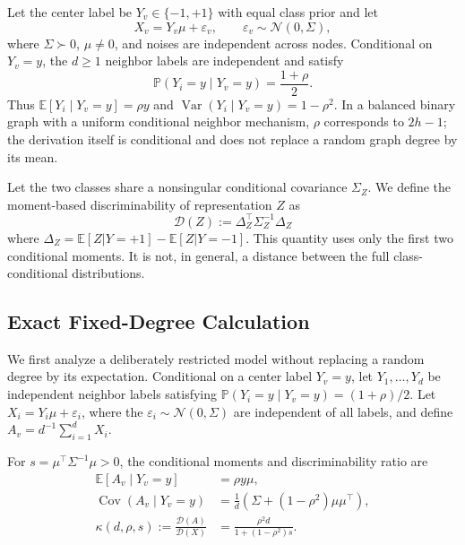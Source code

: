 Let the center label be $Y_v\in\{-1,+1\}$ with equal class prior and let
\begin{equation}
    X_v=Y_v\mu+\varepsilon_v,
    \qquad \varepsilon_v\sim\mathcal{N}(0,\Sigma),
\end{equation}
where $\Sigma\succ0$, $\mu\neq0$, and noises are independent across nodes. Conditional on $Y_v=y$, the $d\geq1$ neighbor labels are independent and satisfy
\begin{equation}
    \mathbb{P}(Y_i=y\mid Y_v=y)=\frac{1+\rho}{2}.
\end{equation}
Thus $\mathbb{E}[Y_i\mid Y_v=y]=\rho y$ and $\operatorname{Var}(Y_i\mid Y_v=y)=1-\rho^2$. In a balanced binary graph with a uniform conditional neighbor mechanism, $\rho$ corresponds to $2h-1$; the derivation itself is conditional and does not replace a random graph degree by its mean.

\begin{definition}
\label{def:discriminability}
Let the two classes share a nonsingular conditional covariance $\Sigma_Z$. We define the moment-based discriminability of representation $Z$ as
\begin{equation}
    \mathcal{D}(Z) := \Delta_Z^\top \Sigma_Z^{-1} \Delta_Z
\end{equation}
where $\Delta_Z = \mathbb{E}[Z|Y=+1] - \mathbb{E}[Z|Y=-1]$. This quantity uses only the first two conditional moments. It is not, in general, a distance between the full class-conditional distributions.
\end{definition}

\subsection{Exact Fixed-Degree Calculation}

We first analyze a deliberately restricted model without replacing a random degree by its expectation. Conditional on a center label $Y_v=y$, let $Y_1,\ldots,Y_d$ be independent neighbor labels satisfying $\mathbb{P}(Y_i=y\mid Y_v=y)=(1+\rho)/2$. Let $X_i=Y_i\mu+\varepsilon_i$, where the $\varepsilon_i\sim\mathcal{N}(0,\Sigma)$ are independent of all labels, and define $A_v=d^{-1}\sum_{i=1}^d X_i$.

\begin{proposition}
\label{prop:fixed_degree}
For $s=\mu^\top\Sigma^{-1}\mu>0$, the conditional moments and discriminability ratio are
\begin{align}
    \mathbb{E}[A_v\mid Y_v=y] &= \rho y\mu,\\
    \operatorname{Cov}(A_v\mid Y_v=y)
        &= \frac{1}{d}\left(\Sigma+(1-\rho^2)\mu\mu^\top\right),\\
    \kappa(d,\rho,s)
        :=\frac{\mathcal{D}(A)}{\mathcal{D}(X)}
        &=\frac{\rho^2d}{1+(1-\rho^2)s}.
\end{align}
\end{proposition}

